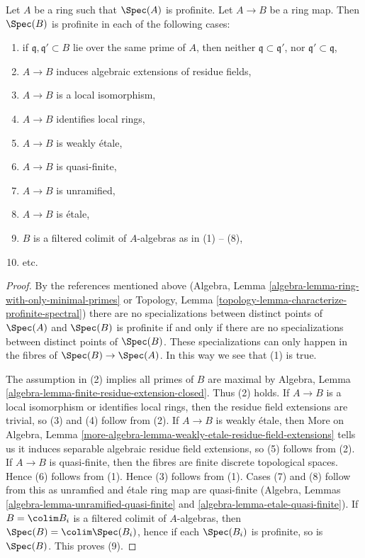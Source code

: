 \begin{lemma}
\label{lemma-profinite-goes-up}
Let $A$ be a ring such that $\Spec(A)$ is profinite. Let $A \to B$ be a
ring map. Then $\Spec(B)$ is profinite in each of the following cases:
\begin{enumerate}
\item if $\mathfrak q,\mathfrak q' \subset B$ lie over the same
prime of $A$, then neither $\mathfrak q \subset \mathfrak q'$, nor
$\mathfrak q' \subset \mathfrak q$,
\item $A \to B$ induces algebraic extensions of residue fields,
\item $A \to B$ is a local isomorphism,
\item $A \to B$ identifies local rings,
\item $A \to B$ is weakly \'etale,
\item $A \to B$ is quasi-finite,
\item $A \to B$ is unramified,
\item $A \to B$ is \'etale,
\item $B$ is a filtered colimit of $A$-algebras as in (1) -- (8),
\item etc.
\end{enumerate}
\end{lemma}

\begin{proof}
By the references mentioned above
(Algebra, Lemma \ref{algebra-lemma-ring-with-only-minimal-primes} or
Topology, Lemma \ref{topology-lemma-characterize-profinite-spectral})
there are no specializations between distinct points of $\Spec(A)$ and
$\Spec(B)$ is profinite if and only if there are no specializations
between distinct points of $\Spec(B)$. These specializations can only
happen in the fibres of $\Spec(B) \to \Spec(A)$. In this way we see
that (1) is true.

\medskip\noindent
The assumption in (2) implies all primes of $B$ are maximal by
Algebra, Lemma \ref{algebra-lemma-finite-residue-extension-closed}.
Thus (2) holds.
If $A \to B$ is a local isomorphism or identifies local rings,
then the residue field extensions are trivial, so (3) and (4)
follow from (2).
If $A \to B$ is weakly \'etale, then More on Algebra, Lemma
\ref{more-algebra-lemma-weakly-etale-residue-field-extensions}
tells us it induces separable algebraic residue field extensions, so
(5) follows from (2).
If $A \to B$ is quasi-finite, then the fibres are finite discrete
topological spaces. Hence (6) follows from (1).
Hence (3) follows from (1). Cases (7) and (8)
follow from this as unramfied and \'etale ring map are quasi-finite
(Algebra, Lemmas
\ref{algebra-lemma-unramified-quasi-finite} and
\ref{algebra-lemma-etale-quasi-finite}).
If $B = \colim B_i$ is a filtered colimit of $A$-algebras, then
$\Spec(B) = \colim \Spec(B_i)$, hence if each $\Spec(B_i)$
is profinite, so is $\Spec(B)$. This proves (9).
\end{proof}

